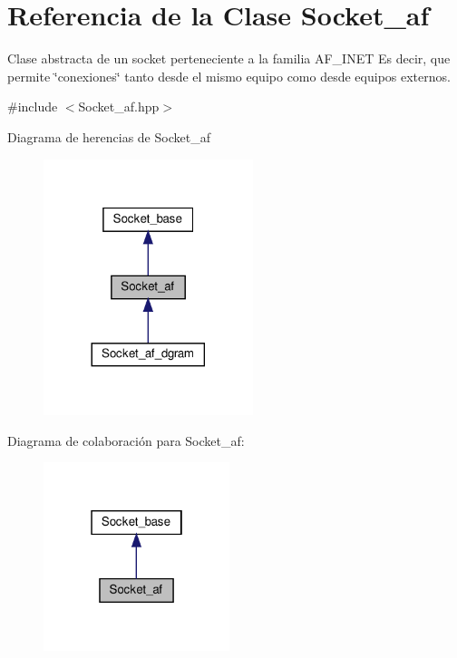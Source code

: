 \hypertarget{classSocket__af}{}\section{Referencia de la Clase Socket\+\_\+af}
\label{classSocket__af}


Clase abstracta de un socket perteneciente a la familia A\+F\+\_\+\+I\+N\+ET Es decir, que permite \char`\"{}conexiones\char`\"{} tanto desde el mismo equipo como desde equipos externos.  




{\ttfamily \#include $<$Socket\+\_\+af.\+hpp$>$}



Diagrama de herencias de Socket\+\_\+af\nopagebreak
\begin{figure}[H]
\begin{center}
\leavevmode
\includegraphics[width=173pt]{classSocket__af__inherit__graph}
\end{center}
\end{figure}


Diagrama de colaboración para Socket\+\_\+af\+:\nopagebreak
\begin{figure}[H]
\begin{center}
\leavevmode
\includegraphics[width=154pt]{classSocket__af__coll__graph}
\end{center}
\end{figure}
